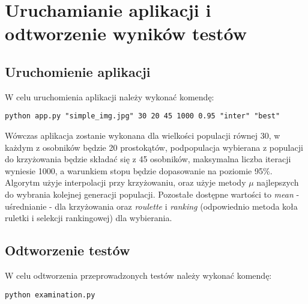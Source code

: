 \section{Uruchamianie aplikacji i odtworzenie wyników testów}
\subsection{Uruchomienie aplikacji}
W celu uruchomienia aplikacji należy wykonać komendę:
\begin{verbatim}
python app.py "simple_img.jpg" 30 20 45 1000 0.95 "inter" "best"
\end{verbatim}
Wówczas aplikacja zostanie wykonana dla wielkości populacji równej 30, w każdym z osobników będzie 20 prostokątów, podpopulacja wybierana z populacji do krzyżowania będzie składać się z 45 osobników, maksymalna liczba iteracji wyniesie 1000, a warunkiem stopu będzie dopasowanie na poziomie 95\%.
Algorytm użyje interpolacji przy krzyżowaniu, oraz użyje metody $\mu$ najlepszych do wybrania kolejnej generacji populacji. Pozostałe dostępne wartości to {\it mean} - uśrednianie - dla krzyżowania oraz {\it roulette} i {\it ranking} (odpowiednio metoda koła ruletki i selekcji rankingowej) dla wybierania.
\subsection{Odtworzenie testów}
W celu odtworzenia przeprowadzonych testów należy wykonać komendę:
\begin{verbatim}
python examination.py
\end{verbatim}